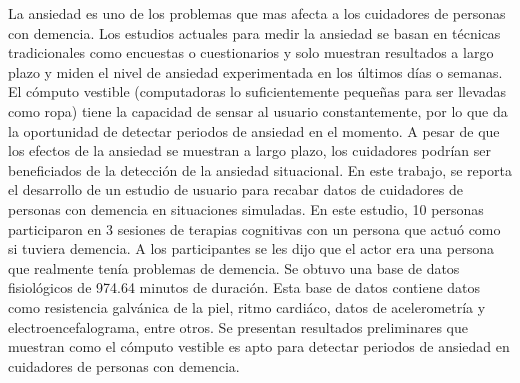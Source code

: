 La ansiedad es uno de los problemas que mas afecta a los cuidadores de personas con demencia. Los estudios actuales para medir la ansiedad se basan en t\'ecnicas tradicionales como encuestas o cuestionarios y solo muestran resultados a largo plazo y miden el nivel de ansiedad experimentada en los \'ultimos d\'ias o semanas. El c\'omputo vestible (computadoras lo suficientemente peque\~nas para ser llevadas como ropa) tiene la capacidad de sensar al usuario constantemente, por lo que da la oportunidad de detectar periodos de ansiedad en el momento. A pesar de que los efectos de la ansiedad se muestran a largo plazo, los cuidadores podr\'ian ser beneficiados de la detecci\'on de la ansiedad situacional. En este trabajo, se reporta el desarrollo de un estudio de usuario para recabar datos de cuidadores de personas con demencia en situaciones simuladas. En este estudio, 10 personas participaron en 3 sesiones de terapias cognitivas con un persona que actu\'o como si tuviera demencia. A los participantes se les dijo que el actor era una persona que realmente ten\'ia problemas de demencia. Se obtuvo una base de datos fisiol\'ogicos de 974.64 minutos de duraci\'on. Esta base de datos contiene datos como resistencia galv\'anica de la piel, ritmo cardi\'aco, datos de acelerometr\'ia y electroencefalograma, entre otros. Se presentan resultados preliminares que muestran como el c\'omputo vestible es apto para detectar periodos de ansiedad en cuidadores de personas con demencia.
